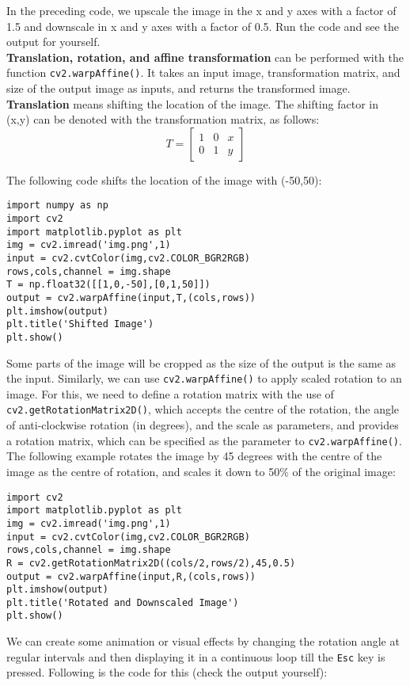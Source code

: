 \documentclass{labo}
\begin{document}
In the preceding code, we upscale the image in the x and y axes with a factor of 1.5 and downscale in x and y axes with a factor of 0.5. Run the code and see the output for yourself.\\

\textbf{Translation, rotation, and affine transformation} can be performed with the function \texttt{cv2.warpAffine()}. It takes an input image, transformation matrix, and size of the output image as inputs, and returns the transformed image.\\

\textbf{Translation} means shifting the location of the image. The shifting factor in (x,y) can be denoted with the transformation matrix, as follows:
\[ T = 
\begin{bmatrix}
1 & 0 & x\\
0 & 1 & y
\end{bmatrix}
\]

The following code shifts the location of the image with (-50,50):

\begin{verbatim}
import numpy as np 
import cv2 
import matplotlib.pyplot as plt 
img = cv2.imread('img.png',1) 
input = cv2.cvtColor(img,cv2.COLOR_BGR2RGB) 
rows,cols,channel = img.shape 
T = np.float32([[1,0,-50],[0,1,50]]) 
output = cv2.warpAffine(input,T,(cols,rows)) 
plt.imshow(output)
plt.title('Shifted Image') 
plt.show()
\end{verbatim}

Some parts of the image will be cropped as the size of the output is the same as the input. Similarly, we can use \texttt{cv2.warpAffine()} to apply scaled rotation to an image. For this, we need to define a rotation matrix with the use of \texttt{cv2.getRotationMatrix2D()}, which accepts the centre of the rotation, the angle of anti-clockwise rotation (in degrees), and the scale as parameters, and provides a rotation matrix, which can be specified as the parameter to \texttt{cv2.warpAffine()}. \\

The following example rotates the image by 45 degrees with the centre of the image as the centre of rotation, and scales it down to 50\% of the original image:

\begin{verbatim}
import cv2 
import matplotlib.pyplot as plt 
img = cv2.imread('img.png',1) 
input = cv2.cvtColor(img,cv2.COLOR_BGR2RGB) 
rows,cols,channel = img.shape 
R = cv2.getRotationMatrix2D((cols/2,rows/2),45,0.5) 
output = cv2.warpAffine(input,R,(cols,rows)) 
plt.imshow(output)
plt.title('Rotated and Downscaled Image') 
plt.show()
\end{verbatim}
We can create some animation or visual effects by changing the rotation angle at regular intervals and then displaying it in a continuous loop till the \texttt{Esc} key is pressed. Following is the code for this (check the output yourself):
\end{document}
